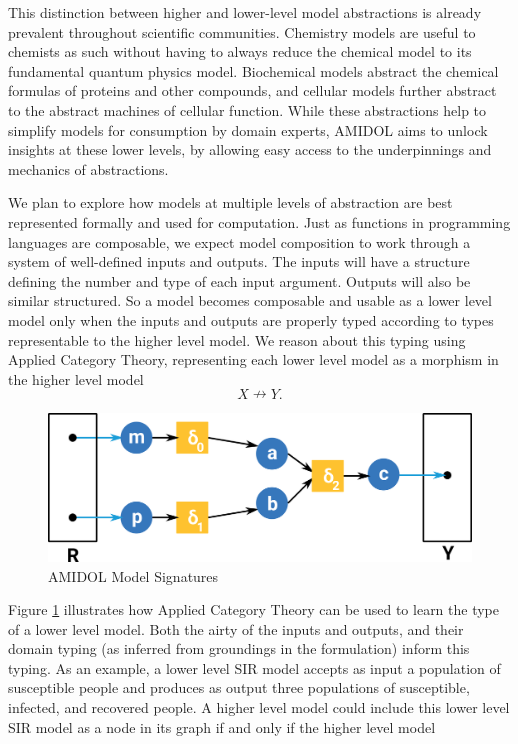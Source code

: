\documentclass[12pt]{galois-whitepaper}
\begin{document}
This distinction between higher and lower-level model abstractions is
already prevalent throughout scientific communities. Chemistry models
are useful to chemists as such without having to always reduce the
chemical model to its fundamental quantum physics model.  Biochemical
models abstract the chemical formulas of proteins and other compounds,
and cellular models further abstract to the abstract machines of
cellular function.  While these abstractions help to simplify models
for consumption by domain experts, AMIDOL aims to unlock insights at
these lower levels, by allowing easy access to the underpinnings and
mechanics of abstractions.

We plan to explore how models at multiple levels of abstraction are
best represented formally and used for computation. Just as functions
in programming languages are composable, we expect model composition
to work through a system of well-defined inputs and outputs. The
inputs will have a structure defining the number and type of each
input argument. Outputs will also be similar structured. So a model
becomes composable and usable as a lower level model only when the
inputs and outputs are properly typed according to types representable
to the higher level model.  We reason about this typing using Applied
Category Theory, representing each lower level model as a morphism in
the higher level model \[X \nrightarrow Y.\]

  \begin{figure}
    \centering
    \includegraphics[width=\textwidth]{figs/series-2.png}
    \caption{AMIDOL Model Signatures}
    \label{Fig:Signature}
  \end{figure}

Figure \ref{Fig:Signature} illustrates how Applied Category Theory can
be used to learn the type of a lower level model.  Both the airty of
the inputs and outputs, and their domain typing (as inferred from
groundings in the formulation) inform this typing. As an example,
a lower level SIR model accepts as input a population of
susceptible people and produces as output three populations of
susceptible, infected, and recovered people. A higher level model
could include this lower level SIR model as a node in its graph if and
only if the higher level model
\end{document}
